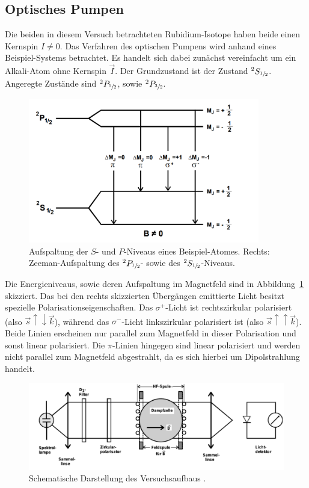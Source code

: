 \documentclass[
  bibliography=totoc,     %
  captions=tableheading,  %
  titlepage=firstiscover, %
]{scrartcl}
\begin{document}
\subsection{Optisches Pumpen}
%
Die beiden in diesem Versuch betrachteten Rubidium-Isotope haben beide einen
Kernspin $I \neq 0$. Das Verfahren des optischen Pumpens wird anhand eines Beispiel-Systems
betrachtet. Es handelt sich dabei zunächst vereinfacht um ein Alkali-Atom ohne Kernspin $\vec{I}$.
Der Grundzustand ist der Zustand $^2S_{\sfrac{1}{2}}$. Angeregte Zustände sind
$^2P_{\sfrac{1}{2}}$, sowie $^2P_{\sfrac{3}{2}}$.
%
\begin{figure}[htb]
  \centering
  \includegraphics[width=0.9\textwidth]{Beispiel.jpg}
  \caption{Aufspaltung der $S$- und $P$-Niveaus eines Beispiel-Atomes. Rechts:
  Zeeman-Aufspaltung des $^2P_{\sfrac{1}{2}}$- sowie des
  $^2S_{\sfrac{1}{2}}$-Niveaus. \cite{anleitung}}
  \label{fig:beispiel}
\end{figure}
\noindent
Die Energieniveaus, sowie deren Aufspaltung im Magnetfeld sind in
Abbildung~\ref{fig:beispiel} skizziert. Das bei den rechts skizzierten
Übergängen emittierte Licht besitzt spezielle Polarisationseigenschaften. Das
$\sigma^+$-Licht ist rechtszirkular polarisiert (also
$\vec{s}↑↓\vec{k}$), während das $\sigma^-$-Licht linkszirkular
polarisiert ist (also $\vec{s}↑↑\vec{k}$). Beide Linien erscheinen nur
parallel zum Magnetfeld in dieser Polarisation und sonst linear polarisiert.
Die $\pi$-Linien hingegen sind linear polarisiert und werden nicht parallel zum
Magnetfeld abgestrahlt, da es sich hierbei um Dipolstrahlung handelt.
%
\begin{figure}[htb]
  \centering
  \includegraphics[width=\textwidth]{Versuchsaufbau.pdf}
  \caption{Schematische Darstellung des Versuchsaufbaus \cite{anleitung}.}
  \label{fig:aufbau}
\end{figure}
\end{document}
